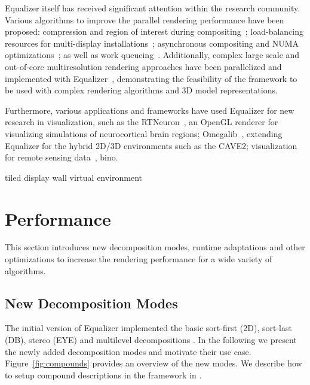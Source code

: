 \documentclass[10pt,journal,compsoc]{IEEEtran}
\newcommand{\fig}[1]{Figure~\ref{#1}}
\begin{document}
Equalizer itself has received significant attention within the research
community. Various algorithms to improve the parallel rendering performance have
been proposed: compression and region of interest during
compositing~\cite{MEP:10}; load-balancing resources for multi-display
installations~\cite{EEP:11}; asynchronous compositing and NUMA
optimizations~\cite{EBAHMP:12}; as well as work queueing~\cite{SPEP:16}.
Additionally, complex large scale and out-of-core multiresolution
rendering approaches have been parallelized and implemented with
Equalizer~\cite{GMBP:10, GEMPG:13}, demonstrating the feasibility of
the framework to be used with complex rendering algorithms and 3D model
representations.

Furthermore, various applications and frameworks have used Equalizer for new research in
visualization, such as the RTNeuron~\cite{HBBES:13}, an OpenGL renderer for
visualizing simulations of neurocortical brain regions; Omegalib~\cite{Omegalib},
extending Equalizer for the hybrid 2D/3D environments such as the CAVE2;
visualization for remote sensing data~\cite{LK:09}, bino.

\cite{CKP:12} tiled display wall virtual environment


\section{Performance}

This section introduces new decomposition modes, runtime adaptations and other
optimizations to increase the rendering performance for a wide variety of
algorithms.

\subsection{New Decomposition Modes}

The initial version of Equalizer implemented the basic sort-first (2D), sort-last (DB),
stereo (EYE) and multilevel decompositions \cite{EMP:09}. In the following we
present the newly added decomposition modes and motivate their use case. \fig{fig:compounds}
provides an overview of the new modes. We describe how to setup compound
descriptions in the framework in \cite{EMP:09}.
\end{document}
